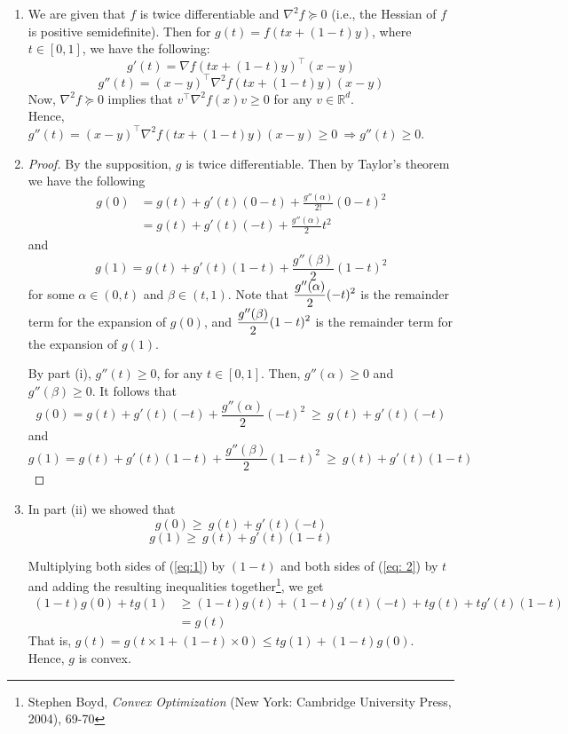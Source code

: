 \documentclass[twoside,11pt]{homework}
\DeclarePairedDelimiter{\2norm}{\lVert}{\rVert^2_2}
\newcommand{\1}[1]{\mathds{1}\left[#1\right]}
\begin{document}
\begin{enumerate}[\bf (i)]

\item We are given that $f$ is twice differentiable and $\nabla^2 f \succeq 0$ (i.e., the Hessian of $f$ is positive semidefinite). Then for $g(t) = f(tx + (1-t)y)$, where $t \in [0, 1]$, we have the following:
$$g'(t) = \nabla f(tx + (1-t)y)^{\top}(x-y)$$
$$g''(t) = (x-y)^{\top}\nabla^2 f(tx + (1-t)y)(x-y)$$
Now, $\nabla^2 f \succeq 0$ implies that $v^{\top}\nabla^2 f(x) v \geq 0$ for any $v \in \mathbb{R}^d$. \\ Hence, $g''(t) = (x-y)^{\top}\nabla^2 f(tx + (1-t)y)(x-y) \geq 0 \ \Longrightarrow g''(t) \geq 0$.

\item 
\begin{proof}
By the supposition, $g$ is twice differentiable. Then by Taylor's theorem we have the following
\begin{align*}
g(0) &= g(t) + g'(t)(0 - t) + \frac{g''(\alpha)}{2!}(0 - t)^2 \\
& = g(t) + g'(t)(- t) + \frac{g''(\alpha)}{2}t^2
\end{align*}
and 
$$g(1) = g(t) + g'(t)(1 - t) + \frac{g''(\beta)}{2}(1 - t)^2$$ 
for some $\alpha \in (0, t)$ and $\beta \in (t, 1)$. Note that $\mathlarger{\frac{g''(\alpha)}{2}(- t)^2}$ is the remainder term for the expansion of $g(0)$, and $\mathlarger{\frac{g''(\beta)}{2}(1 - t)^2}$ is the remainder term for the expansion of $g(1)$. 

By part (i), $g''(t) \geq 0$, for any $t \in [0, 1]$. Then, $g''(\alpha) \geq 0$ and $g''(\beta) \geq 0$. It follows that
$$ g(0) = g(t) + g'(t)(- t) + \frac{g''(\alpha)}{2}(- t)^2  \ \geq \ g(t) + g'(t)(- t)$$
and 
$$ g(1) = g(t) + g'(t)(1 - t) + \frac{g''(\beta)}{2}(1 - t)^2 \ \geq \ g(t) + g'(t)(1 - t)$$
\end{proof}


\item In part (ii) we showed that 
\begin{equation} \label{eq:1}
g(0) \geq \ g(t) + g'(t)(- t)
\end{equation}
\begin{equation} \label{eq: 2}
g(1) \geq \ g(t) + g'(t)(1 - t)
\end{equation}

Multiplying both sides of (\ref{eq:1}) by $(1-t)$ and both sides of (\ref{eq: 2}) by $t$ and adding the resulting inequalities together\footnote{Stephen Boyd, \textit{Convex Optimization} (New York: Cambridge University Press, 2004), 69-70},  we get
\begin{align*}
(1-t)g(0) + tg(1) &\geq (1-t)g(t) + (1-t)g'(t)(-t) + tg(t) + tg'(t)(1-t) \\
& = g(t)
\end{align*}
That is, $g(t) = g(t\times1 + (1-t)\times0) \leq tg(1) + (1-t)g(0)$. \\ Hence, $g$ is convex.

\end{enumerate}
\end{document}
